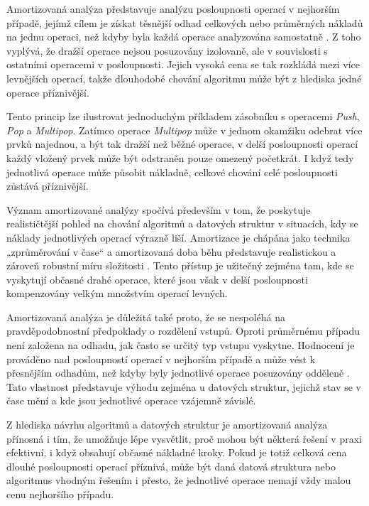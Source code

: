 Amortizovaná analýza představuje analýzu posloupnosti operací v nejhorším případě, jejímž cílem je získat těsnější odhad celkových nebo průměrných nákladů na jednu operaci, než kdyby byla každá operace analyzována samostatně \cite{kozen_amortized}. Z toho vyplývá, že dražší operace nejsou posuzovány izolovaně, ale v souvislosti s ostatními operacemi v posloupnosti. Jejich vysoká cena se tak rozkládá mezi více levnějších operací, takže dlouhodobé chování algoritmu může být z hlediska jedné operace příznivější.

Tento princip lze ilustrovat jednoduchým příkladem zásobníku s operacemi \textit{Push}, \textit{Pop} a \textit{Multipop}. Zatímco operace \textit{Multipop} může v jednom okamžiku odebrat více prvků najednou, a být tak dražší než běžné operace, v delší posloupnosti operací každý vložený prvek může být odstraněn pouze omezený početkrát. I když tedy jednotlivá operace může působit nákladně, celkové chování celé posloupnosti zůstává příznivější.

Význam amortizované analýzy spočívá především v tom, že poskytuje realističtější pohled na chování algoritmů a datových struktur v situacích, kdy se náklady jednotlivých operací výrazně liší. Amortizace je chápána jako technika „zprůměrování v čase“ a amortizovaná doba běhu představuje realistickou a zároveň robustní míru složitosti \cite{tarjan1985amortized}. Tento přístup je užitečný zejména tam, kde se vyskytují občasné drahé operace, které jsou však v delší posloupnosti kompenzovány velkým množstvím operací levných.

Amortizovaná analýza je důležitá také proto, že se nespoléhá na pravděpodobnostní předpoklady o rozdělení vstupů. Oproti průměrnému případu není založena na odhadu, jak často se určitý typ vstupu vyskytne. Hodnocení je prováděno nad posloupností operací v nejhorším případě a může vést k přesnějším odhadům, než kdyby byly jednotlivé operace posuzovány odděleně \cite{kozen_amortized}. Tato vlastnost představuje výhodu zejména u datových struktur, jejichž stav se v čase mění a kde jsou jednotlivé operace vzájemně závislé.

Z hlediska návrhu algoritmů a datových struktur je amortizovaná analýza přínosná i tím, že umožňuje lépe vysvětlit, proč mohou být některá řešení v praxi efektivní, i když obsahují občasné nákladné kroky. Pokud je totiž celková cena dlouhé posloupnosti operací příznivá, může být daná datová struktura nebo algoritmus vhodným řešením i přesto, že jednotlivé operace nemají vždy malou cenu nejhoršího případu.

